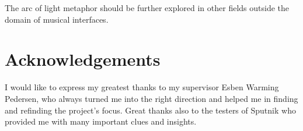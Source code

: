 \documentclass[10pt,a4paper]{scrartcl}
\begin{document}
The arc of light metaphor should be further explored in other fields outside the domain of musical interfaces. 



\section{Acknowledgements}
I would like to express my greatest thanks to my supervisor Esben Warming Pedersen, who always turned me into the right direction and helped me in finding and refinding the project's focus. Great thanks also to the testers of Sputnik who provided me with many important clues and insights. 



\clearpage


\end{document}
